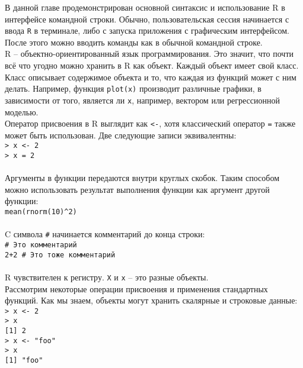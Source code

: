    В данной главе продемонстрирован основной синтаксис и использование R в интерфейсе 
    командной строки. Обычно, пользовательская сессия начинается с ввода \texttt{R} в 
    терминале, либо с запуска приложения с графическим интерфейсом. После этого можно вводить
    команды как в обычной командной строке.\\

    \indent R -- объектно-ориентированный язык программирования. Это значит, что почти всё что 
    угодно можно хранить в R как объект. Каждый объект имеет свой класс. Класс описывает
    содержимое объекта и то, что каждая из функций может с ним делать. Например, функция
    \texttt{plot(x)} производит различные графики, в зависимости от того, является ли 
    \texttt{x}, например, вектором или регрессионной моделью. \\
    
    \indent Оператор присвоения в R выглядит как \texttt{<-}, хотя классический оператор \texttt{=}
    также может быть использован. Две следующие записи эквивалентны: \\
    \indent \texttt{> x <- 2} \\
    \indent \texttt{> x = 2} \\ \\
    
    \indent Аргументы в функции передаются внутри круглых скобок. Таким способом можно использовать 
    результат выполнения функции как аргумент другой функции: \\
    \indent \texttt{mean(rnorm(10)\^{}2)} \\ \\
    
    \indent C символа \texttt{\#} начинается комментарий до конца строки: \\
    \indent \texttt{\# Это комментарий} \\
    \indent \texttt{2+2 \# Это тоже комментарий} \\ \\
    
    \indent R чувствителен к регистру. \texttt{X} и \texttt{x} -- это разные объекты. \\
    
    \indent Рассмотрим некоторые операции присвоения и применения стандартных функций. Как мы
    знаем, объекты могут хранить скалярные и строковые данные: \\
    \indent \texttt{> x <- 2} \\
    \indent \texttt{> x} \\
    \indent \texttt{[1] 2} \\
    \indent \texttt{> x <- "foo"} \\
    \indent \texttt{> x } \\
    \indent \texttt{[1] "foo"} \\ \\
    
